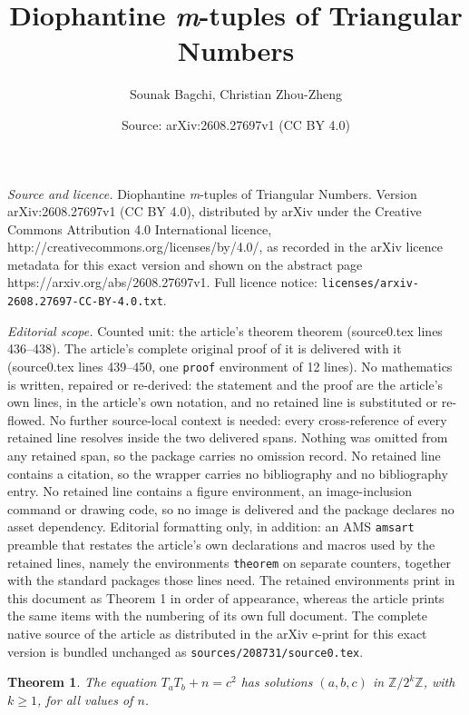 \documentclass[10pt,a4paper]{amsart}
\title{Diophantine \emph{m}-tuples of Triangular Numbers}
\author{Sounak Bagchi, Christian Zhou-Zheng}
\date{Source: arXiv:2608.27697v1 (CC BY 4.0)}
\newtheorem{theorem}{Theorem}
\begin{document}
\maketitle

\noindent\emph{Source and licence.} Diophantine \emph{m}-tuples of Triangular Numbers. Version arXiv:2608.27697v1 (CC BY 4.0), distributed by arXiv under the Creative Commons Attribution 4.0 International licence, http://creativecommons.org/licenses/by/4.0/, as recorded in the arXiv licence metadata for this exact version and shown on the abstract page https://arxiv.org/abs/2608.27697v1. Full licence notice: \texttt{licenses/arxiv-2608.27697-CC-BY-4.0.txt}.\par\smallskip

\noindent\textit{Editorial scope.} Counted unit: the article's theorem theorem (source0.tex lines 436--438). The article's complete original proof of it is delivered with it (source0.tex lines 439--450, one \texttt{proof} environment of 12 lines). No mathematics is written, repaired or re-derived: the statement and the proof are the article's own lines, in the article's own notation, and no retained line is substituted or re-flowed.  No further source-local context is needed: every cross-reference of every retained line resolves inside the two delivered spans.  Nothing was omitted from any retained span, so the package carries no omission record.  No retained line contains a citation, so the wrapper carries no bibliography and no bibliography entry.  No retained line contains a figure environment, an image-inclusion command or drawing code, so no image is delivered and the package declares no asset dependency.  Editorial formatting only, in addition: an AMS \texttt{amsart} preamble that restates the article's own declarations and macros used by the retained lines, namely the environments \texttt{theorem} on separate counters, together with the standard packages those lines need.  The retained environments print in this document as Theorem 1 in order of appearance, whereas the article prints the same items with the numbering of its own full document.  The complete native source of the article as distributed in the arXiv e-print for this exact version is bundled unchanged as \texttt{sources/208731/source0.tex}.
\begin{theorem}
    The equation $T_a T_b + n = c^2$ has solutions $(a,b,c)$ in $\mathbb{Z} / 2^k \mathbb{Z}$, with $k \ge 1$, for all values of $n$.
\end{theorem}
\end{document}
